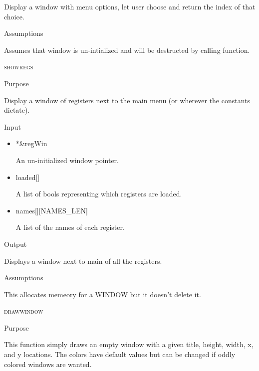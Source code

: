 \documentclass[pdftex, 11pt]{article}
\begin{document}
\begin{description}
\begin{description}
				Display a window with menu options, let user choose and
				return the index of that choice.

			\item{Assumptions}

				Assumes that window is un-intialized and will be destructed
				by calling function.

		\end{description}


	\item{\textsc{showregs}}

		\begin{description}
			\item{Purpose}

 				Display a window of registers next to the main menu (or wherever the constants
				dictate).

			\item{Input}
			
				\begin{itemize}

					\item{*\&regWin}
						
						An un-initialized window pointer.

					\item{loaded[]}

						A list of bools representing which registers are loaded.

					\item{names[][NAMES\_LEN]}

						A list of the names of each register.

				\end{itemize}

			\item{Output}

				Displays a window next to main of all the registers.

			\item{Assumptions}

				This allocates memeory for a WINDOW but it doesn't delete it.

		\end{description}


	\item{\textsc{drawwindow}}

		\begin{description}
			\item{Purpose}

				This function simply draws an empty window with a given title, height, width,
				x, and y locations.  The colors have default values but can be changed if
				oddly colored windows are wanted.


\end{description}
\end{description}
\end{document}
